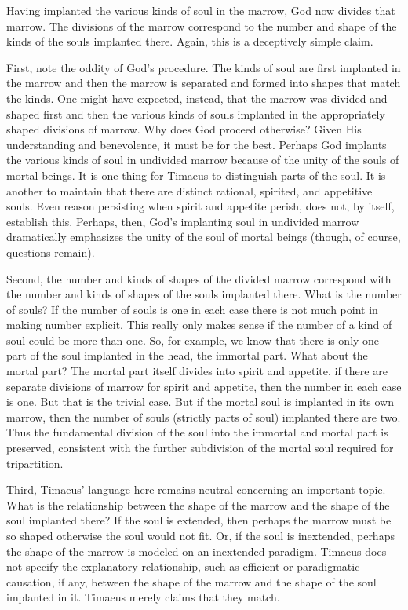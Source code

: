 Having implanted the various kinds of soul in the marrow, God now divides that marrow. The divisions of the marrow correspond to the number and shape of the kinds of the souls implanted there. Again, this is a deceptively simple claim.

First, note the oddity of God's procedure. The kinds of soul are first implanted in the marrow and then the marrow is separated and formed into shapes that match the kinds. One might have expected, instead, that the marrow was divided and shaped first and then the various kinds of souls implanted in the appropriately shaped divisions of marrow. Why does God proceed otherwise? Given His understanding and benevolence, it must be for the best. Perhaps God implants the various kinds of soul in undivided marrow because of the unity of the souls of mortal beings. It is one thing for Timaeus to distinguish parts of the soul. It is another to maintain that there are distinct rational, spirited, and appetitive souls. Even reason persisting when spirit and appetite perish, does not, by itself, establish this. Perhaps, then, God's implanting soul in undivided marrow dramatically emphasizes the unity of the soul of mortal beings (though, of course, questions remain).

Second, the number and kinds of shapes of the divided marrow correspond with the number and kinds of shapes of the souls implanted there. What is the number of souls? If the number of souls is one in each case there is not much point in making number explicit. This really only makes sense if the number of a kind of soul could be more than one. So, for example, we know that there is only one part of the soul implanted in the head, the immortal part. What about the mortal part? The mortal part itself divides into spirit and appetite. if there are separate divisions of marrow for spirit and appetite, then the number in each case is one. But that is the trivial case. But if the mortal soul is implanted in its own marrow, then the number of souls (strictly parts of soul) implanted there are two. Thus the fundamental division of the soul into the immortal and mortal part is preserved, consistent with the further subdivision of the mortal soul required for tripartition.

Third, Timaeus' language here remains neutral concerning an important topic. What is the relationship between the shape of the marrow and the shape of the soul implanted there? If the soul is extended, then perhaps the marrow must be so shaped otherwise the soul would not fit. Or, if the soul is inextended, perhaps the shape of the marrow is modeled on an inextended paradigm. Timaeus does not specify the explanatory relationship, such as efficient or paradigmatic causation, if any, between the shape of the marrow and the shape of the soul implanted in it. Timaeus merely claims that they match.

